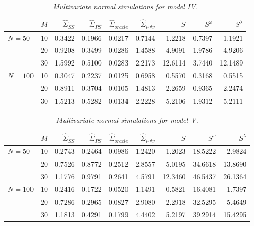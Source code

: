 %
\begin{table}[H]
\centering
\caption{\textit{Multivariate normal simulations for model IV.}}
\begin{tabular}{lrrrrrrrr}
 & $M$ &$\hat{\Sigma}_{SS}$& $\hat{\Sigma}_{PS}$ &$\hat{\Sigma}_{oracle}$& $\hat{\Sigma}_{poly}$ & $S$ &$S^\omega$& $S^\lambda$ \\ 
  \hline
 $N = 50$ & $10$ & 0.3422 & 0.1966 & 0.0217 & 0.7144 & 1.2218 & 0.7397 & 1.1921 \\ 
   & $20$ & 0.9208 & 0.3499 & 0.0286 & 1.4588 & 4.9091 & 1.9786 & 4.9206 \\ 
       & $30$ & 1.5992 & 0.5100 & 0.0283 & 2.2173 & 12.6114 & 3.7440 & 12.1489 \\ 
     $N = 100$ & 10 & 0.3047 & 0.2237 & 0.0125 & 0.6958 & 0.5570 & 0.3168 & 0.5515 \\ 
       & $20$ & 0.8911 & 0.3704 & 0.0105 & 1.4813 & 2.2659 & 0.9365 & 2.2474 \\ 
       & $30$ & 1.5213 & 0.5282 & 0.0134 & 2.2228 & 5.2106 & 1.9312 & 5.2111 \\ 
   \hline
\end{tabular} 
\label{table:simulation-1-entropy-loss-sigma-4}
\end{table}

%
\begin{table}[H]
\centering
\caption{\textit{Multivariate normal simulations for model V.}}
\begin{tabular}{lrrrrrrrr}
 & $M$ &$\hat{\Sigma}_{SS}$& $\hat{\Sigma}_{PS}$ &$\hat{\Sigma}_{oracle}$& $\hat{\Sigma}_{poly}$ & $S$ &$S^\omega$& $S^\lambda$ \\ 
  \hline
 $N = 50$ & $10$ & 0.2743 & 0.2464 & 0.0986 & 1.2420 & 1.2023 & 18.5222 & 2.9824 \\ 
  & $20$ & 0.7526 & 0.8772 & 0.2512 & 2.8557 & 5.0195 & 34.6618 & 13.8690 \\ 
  & $30$ & 1.1776 & 0.9791 & 0.2641 & 4.5791 & 12.3460 & 46.5437 & 26.1364 \\ 
 $N = 100$ & 10 & 0.2416 & 0.1722 & 0.0520 & 1.1491 & 0.5821 & 16.4081 & 1.7397 \\ 
  & $20$ & 0.7286 & 0.2965 & 0.0827 & 2.9080 & 2.2918 & 32.5295 & 5.4649 \\ 
   & $30$ & 1.1813 & 0.4291 & 0.1799 & 4.4402 & 5.2197 & 39.2914 & 15.4295 \\ 
   \hline
\end{tabular}\label{table:simulation-1-entropy-loss-sigma-5}
\end{table}


